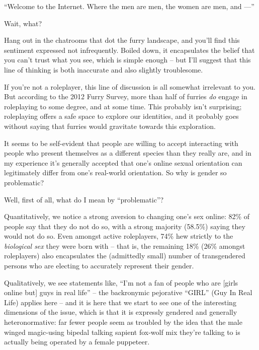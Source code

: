 
``Welcome to the Internet. Where the men are men, the women are men, and —''

Wait, what?

Hang out in the chatrooms that dot the furry landscape, and you’ll find this sentiment expressed not infrequently. Boiled down, it encapsulates the belief that you can’t trust what you see, which is simple enough -- but I’ll suggest that this line of thinking is both inaccurate and also slightly troublesome.

If you’re not a roleplayer, this line of discussion is all somewhat irrelevant to you. But according to the 2012 Furry Survey, more than half of furries \textit{do} engage in roleplaying to some degree, and at some time. This probably isn’t surprising; roleplaying offers a safe space to explore our identities, and it probably goes without saying that furries would gravitate towards this exploration.

It seems to be self-evident that people are willing to accept interacting with people who present themselves as a different species than they really are, and in my experience it’s generally accepted that one’s online sexual orientation can legitimately differ from one’s real-world orientation. So why is gender so problematic?

Well, first of all, what do I mean by ``problematic''?

Quantitatively, we notice a strong aversion to changing one’s sex online: 82\% of people say that they do not do so, with a strong majority (58.5\%) saying they would not do so. Even amongst active roleplayers, 74\% hew strictly to the \textit{biological sex} they were born with -- that is, the remaining 18\% (26\% amongst roleplayers) also encapsulates the (admittedly small) number of transgendered persons who are electing to accurately represent their gender.

Qualitatively, we see statements like, ``I’m not a fan of people who are [girls online but] guys in real life'' -- the backronymic pejorative ``GIRL'' (Guy In Real Life) applies here -- and it is here that we start to see one of the interesting dimensions of the issue, which is that it is expressly gendered and generally heteronormative: far fewer people seem as troubled by the idea that the male winged magic-using bipedal talking sapient fox-wolf mix they’re talking to is actually being operated by a female puppeteer.

